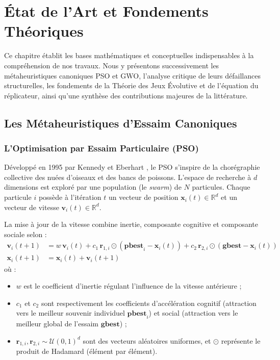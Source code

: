 \chapter{État de l'Art et Fondements Théoriques}
\label{chap:etat_art}

Ce chapitre établit les bases mathématiques et conceptuelles indispensables à la compréhension de nos travaux. Nous y présentons successivement les métaheuristiques canoniques PSO et GWO, l'analyse critique de leurs défaillances structurelles, les fondements de la Théorie des Jeux Évolutive et de l'équation du réplicateur, ainsi qu'une synthèse des contributions majeures de la littérature.

\section{Les Métaheuristiques d'Essaim Canoniques}

\subsection{L'Optimisation par Essaim Particulaire (PSO)}
Développé en 1995 par Kennedy et Eberhart \cite{kennedy1995particle}, le PSO s'inspire de la chorégraphie collective des nuées d'oiseaux et des bancs de poissons. L'espace de recherche à $d$ dimensions est exploré par une population (le \textit{swarm}) de $N$ particules. Chaque particule $i$ possède à l'itération $t$ un vecteur de position $\mathbf{x}_i(t) \in \mathbb{R}^d$ et un vecteur de vitesse $\mathbf{v}_i(t) \in \mathbb{R}^d$.

La mise à jour de la vitesse combine inertie, composante cognitive et composante sociale selon :
\begin{align}
    \mathbf{v}_i(t+1) &= w \, \mathbf{v}_i(t) + c_1 \, \mathbf{r}_{1,i} \odot \left(\mathbf{pbest}_i - \mathbf{x}_i(t)\right) + c_2 \, \mathbf{r}_{2,i} \odot \left(\mathbf{gbest} - \mathbf{x}_i(t)\right) \label{eq:pso_vel}\\
    \mathbf{x}_i(t+1) &= \mathbf{x}_i(t) + \mathbf{v}_i(t+1) \label{eq:pso_pos}
\end{align}
où :
\begin{itemize}[label=\textbullet]
    \item $w$ est le coefficient d'inertie régulant l'influence de la vitesse antérieure ;
    \item $c_1$ et $c_2$ sont respectivement les coefficients d'accélération cognitif (attraction vers le meilleur souvenir individuel $\mathbf{pbest}_i$) et social (attraction vers le meilleur global de l'essaim $\mathbf{gbest}$) ;
    \item $\mathbf{r}_{1,i}, \mathbf{r}_{2,i} \sim \mathcal{U}(0, 1)^d$ sont des vecteurs aléatoires uniformes, et $\odot$ représente le produit de Hadamard (élément par élément).
\end{itemize}

